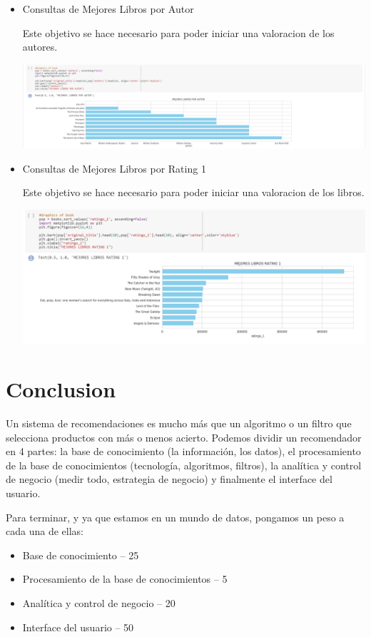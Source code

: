 \documentclass[preprint,12pt]{elsarticle}
\begin{document}
\begin{itemize}
\item Consultas de Mejores Libros por Autor 

Este objetivo se hace necesario para poder iniciar una valoracion de los autores.

\begin {center}
\includegraphics[scale= 0.40]{./Imagenes/libros-autor.png}
\end {center}


\item Consultas de Mejores Libros por Rating 1

Este objetivo se hace necesario para poder iniciar una valoracion de los libros.

\begin {center}
\includegraphics[scale= 0.50]{./Imagenes/libros.png}
\end {center}


\end{itemize}


\section{Conclusion}
Un sistema de recomendaciones es mucho más que un algoritmo o un filtro que selecciona productos con más o menos acierto. Podemos dividir un recomendador en 4 partes: la base de conocimiento (la información, los datos), el procesamiento de la base de conocimientos (tecnología, algoritmos, filtros), la analítica y control de negocio (medir todo, estrategia de negocio) y finalmente el interface del usuario.

Para terminar, y ya que estamos en un mundo de datos, pongamos un peso a cada una de ellas:
\begin{itemize}
	\item Base de conocimiento – 25%
	\item Procesamiento de la base de conocimientos – 5%
	\item Analítica y control de negocio – 20%
	\item Interface del usuario – 50%
\end{itemize}
\end{document}
